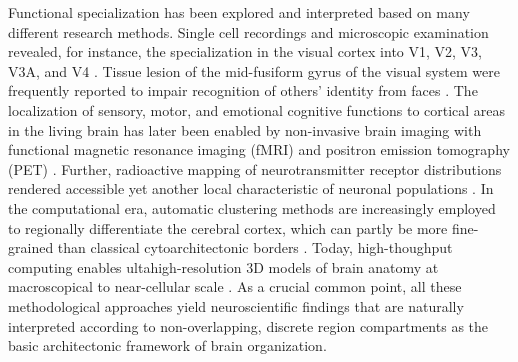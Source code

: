 \documentclass{article} %
\begin{document}
Functional specialization has been
explored and interpreted based on many different research methods.
%
Single cell recordings and microscopic examination
revealed, for instance, the
specialization in the visual cortex into V1, V2, V3, V3A, and V4
\cite{hubel1962receptive, zeki1978functional}.
Tissue lesion of the mid-fusiform gyrus of the visual system
were frequently reported to impair
recognition of others' identity from faces
\cite{iaria2008contrib}.
The localization of
sensory, motor, and emotional cognitive functions to cortical areas
in the living brain
has later been enabled by
non-invasive brain imaging with
functional magnetic resonance imaging (fMRI) and
positron emission tomography (PET)
\cite{fristen1997imaging}.
Further,
radioactive mapping of neurotransmitter receptor distributions
rendered accessible yet another
local characteristic of neuronal populations
\cite{zilles2009receptor}.
In the computational era,
automatic clustering methods are increasingly employed to
regionally differentiate the cerebral cortex,
which can partly be more fine-grained than
classical cytoarchitectonic borders
\cite{behrens03, cbp2015review}.
Today,
high-thoughput computing enables 
ultahigh-resolution 3D models of brain anatomy
at macroscopical to near-cellular scale
\cite{amunts2013bigbrain}.
%
As a crucial common point,
all these methodological approaches
yield neuroscientific findings
that are naturally interpreted according to
non-overlapping, discrete region compartments
as the basic architectonic framework of brain organization.
\end{document}
